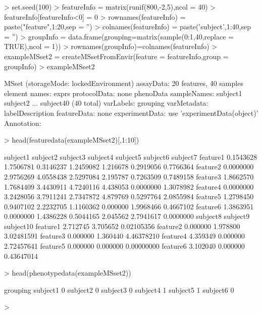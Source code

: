 \documentclass[12pt]{article}
\begin{document}
\begin{Schunk}
\begin{Sinput}
> set.seed(100)
> featureInfo = matrix(runif(800,-2,5),ncol = 40)
> featureInfo[featureInfo<0] = 0
> rownames(featureInfo) = paste("feature",1:20,sep = '')
> colnames(featureInfo) = paste('subject',1:40,sep = '')
> groupInfo = data.frame(grouping=matrix(sample(0:1,40,replace = TRUE),ncol = 1))
> rownames(groupInfo)=colnames(featureInfo)
> exampleMSset2 = createMSsetFromEnvir(feature = featureInfo,group = groupInfo)
> exampleMSset2
\end{Sinput}
\begin{Soutput}
MSset (storageMode: lockedEnvironment)
assayData: 20 features, 40 samples 
  element names: exprs 
protocolData: none
phenoData
  sampleNames: subject1 subject2 ... subject40 (40 total)
  varLabels: grouping
  varMetadata: labelDescription
featureData: none
experimentData: use 'experimentData(object)'
Annotation:  
\end{Soutput}
\begin{Sinput}
> head(featuredata(exampleMSset2)[,1:10])
\end{Sinput}
\begin{Soutput}
          subject1  subject2  subject3  subject4 subject5  subject6  subject7
feature1 0.1543628 1.7506781 0.3146237 1.2459082 1.216678 0.2919056 0.7766364
feature2 0.0000000 2.9756269 4.0558438 2.5297084 2.195787 0.7263509 0.7489158
feature3 1.8662570 1.7684409 3.4430911 4.7240116 4.438053 0.0000000 1.3078982
feature4 0.0000000 3.2428056 3.7911241 2.7347872 4.879769 0.5297764 2.0855984
feature5 1.2798450 0.9407102 2.2232705 1.1160362 0.000000 1.9968466 0.4667102
feature6 1.3863951 0.0000000 1.4386228 0.5044165 2.045562 2.7941617 0.0000000
         subject8 subject9  subject10
feature1 2.712745 3.705652 0.02105356
feature2 0.000000 1.978800 3.02481591
feature3 0.000000 1.360440 4.46378210
feature4 4.359349 0.000000 2.72457641
feature5 0.000000 0.000000 0.00000000
feature6 3.102040 0.000000 0.43647014
\end{Soutput}
\begin{Sinput}
> head(phenotypedata(exampleMSset2))
\end{Sinput}
\begin{Soutput}
         grouping
subject1        0
subject2        0
subject3        0
subject4        1
subject5        1
subject6        0
\end{Soutput}
\begin{Sinput}
> 
\end{Sinput}
\end{Schunk}
\end{document}
